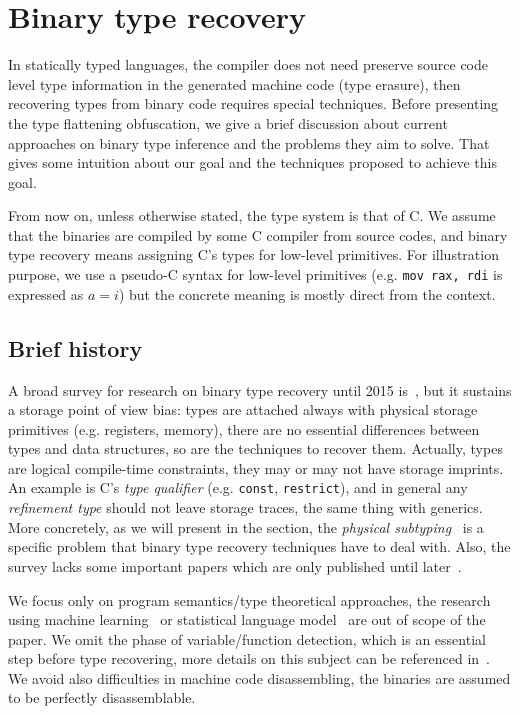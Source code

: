 \documentclass[compsoc,conference,a4paper,10pt,times]{IEEEtran}
\begin{document}
\section{Binary type recovery}
\noindent
In statically typed languages, the compiler does not need preserve source code level type information in
the generated machine code (type erasure), then recovering types from binary code requires special
techniques. Before presenting the type flattening obfuscation, we give a brief discussion about
current approaches on binary type inference and the problems they aim to solve.
That gives some intuition about our goal and the techniques proposed to achieve this goal.

From now on, unless otherwise stated, the type system is that of C. We assume that the binaries are
compiled by some C compiler from source codes, and binary type recovery means assigning C's types for
low-level primitives. For illustration purpose, we use a pseudo-C syntax for low-level primitives
(e.g. \texttt{\small mov rax, rdi} is expressed as $a = i$) but the concrete meaning is mostly direct from the context.

\subsection{Brief history}
\noindent
A broad survey for research on binary type recovery until 2015 is~\cite{caballero_type_2016}, but it sustains a storage point of view bias: types are attached
always with physical storage primitives (e.g. registers, memory), there are no essential differences between types and
data structures, so are the techniques to recover them. Actually, types are logical compile-time constraints, they
may or may not have storage imprints. An example is C's \emph{type qualifier} (e.g.
\texttt{\small const}, \texttt{\small restrict}), and in general any
\emph{refinement type} should not leave storage traces, the same thing with generics. More concretely, as
we will present in the section, the \emph{physical subtyping}~\cite{siff_coping_1999} is a specific problem that binary type
recovery techniques have to deal with.
Also, the survey lacks some important
papers which are only published until later~\cite{noonan_polymorphic_2016,robbins_minx_2016}.

We focus only on program semantics/type theoretical approaches, the research using machine learning~\cite{maier_typeminer_2019}
or statistical language model~\cite{katz_estimating_2016} are out of scope of the paper.
We omit the phase of variable/function detection, which is an essential step before
type recovering, more details on this subject can be referenced in~\cite{balakrishnan_divine_2007}.
We avoid also difficulties in machine code disassembling, the binaries are assumed to be perfectly disassemblable.
\end{document}
